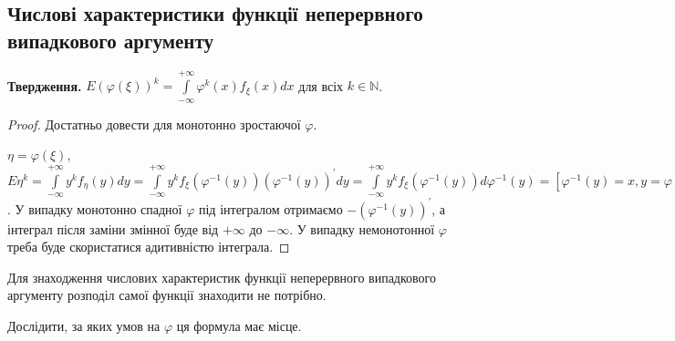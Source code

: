 \subsection{Числові характеристики функції неперервного випадкового аргументу}
\noindent\textbf{Твердження.} $E (\varphi(\xi))^k = \int\limits_{-\infty}^{+\infty} \varphi^k(x) f_\xi(x) dx$ для всіх $k \in \mathbb{N}$.
\begin{proof}
    Достатньо довести для монотонно зростаючої $\varphi$.

    \noindent$\eta = \varphi(\xi)$, $E\eta^k = \int\limits_{-\infty}^{+\infty} y^k f_\eta(y) dy = \int\limits_{-\infty}^{+\infty} y^k f_\xi (\varphi^{-1} (y)) (\varphi^{-1} (y))^\prime dy =
    \int\limits_{-\infty}^{+\infty} y^k f_\xi(\varphi^{-1} (y)) d \varphi^{-1} (y) = \left[ \varphi^{-1} (y) = x, y = \varphi(x)\right] = \int\limits_{-\infty}^{+\infty} \varphi^k(x) f_\xi(x) dx$.
    У випадку монотонно спадної $\varphi$ під інтегралом отримаємо $-(\varphi^{-1} (y))^\prime$, а інтеграл після заміни змінної буде від $+\infty$ до $-\infty$.
    У випадку немонотонної $\varphi$ треба буде скористатися адитивністю інтеграла.
\end{proof}

\begin{remark}
    Для знаходження числових характеристик функції неперервного випадкового аргументу розподіл самої функції знаходити не потрібно.
\end{remark}

\begin{exercise}
    Дослідити, за яких умов на $\varphi$ ця формула має місце.
\end{exercise}